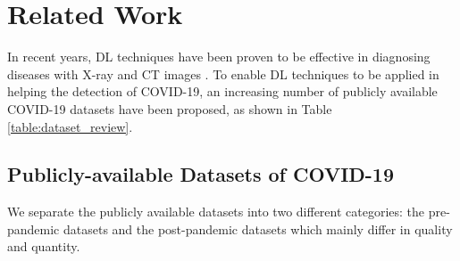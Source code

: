 \documentclass[letterpaper]{article}
\begin{document}


\section{Related Work}
In recent years, DL techniques have been proven to be effective in diagnosing diseases with X-ray and CT images \cite{Litjens2017}. To enable DL techniques to be applied in helping the detection of COVID-19, an increasing number of publicly available COVID-19 datasets have been proposed, as shown in Table \ref{table:dataset_review}. 


\subsection{Publicly-available Datasets of COVID-19}
We separate the publicly available datasets into two different categories: the pre-pandemic datasets and the post-pandemic datasets which mainly differ in quality and quantity.
\end{document}

